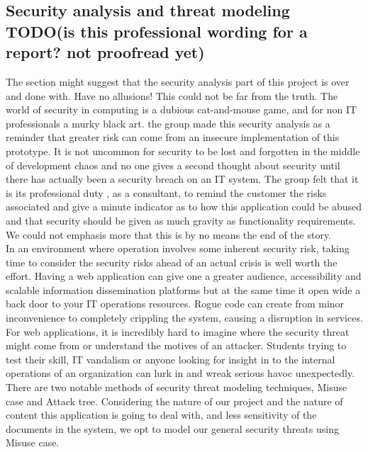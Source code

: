 \subsection{Security analysis and threat modeling TODO(is this professional wording for a report? not proofread yet)}
The section might suggest that the security analysis part of this project is over and done with. Have no allusions! This could not be far from the truth. The world of security in computing is a dubious cat-and-mouse game, and for non IT professionals a murky black art.  the group made this security analysis as a reminder that greater risk can come from an insecure implementation of this prototype. It is not uncommon for security to be lost and forgotten in the middle of development chaos and no one gives a second thought about security until there has actually been a security breach on an IT system.  The group felt that it is its professional duty , as a consultant, to  remind the customer  the risks associated and give a minute  indicator as to how this application could be abused and that security should be given as much gravity as functionality requirements. We could not emphasis more that this is by no means the end of the story.
\\[0.2cm]
In an environment where operation involves some inherent security risk, taking time to consider the security risks ahead of an actual crisis is well worth the effort. Having a web application can give one a greater audience, accessibility and scalable information dissemination platforms but at the same time it open wide a back door to your IT operations resources. Rogue code can create from minor inconvenience to completely crippling the system, causing a disruption in services. For web applications, it is incredibly hard to imagine where the security threat might come from or understand the motives of an attacker. Students trying to test their skill, IT vandalism or anyone looking for insight in to the internal operations of an organization can lurk in and wreak serious havoc unexpectedly.
\\[0.5cm]
There are two notable methods of security threat modeling techniques, Misuse case and Attack tree. Considering the nature of our project and the nature of content this application is going to deal with, and less sensitivity of the documents in the system, we opt to model our general security threats using Misuse case.
